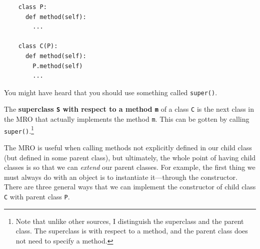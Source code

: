   \begin{lstlisting}
    class P: 
      def method(self): 
        ...

    class C(P): 
      def method(self): 
        P.method(self) 
        ...
  \end{lstlisting} 

  You might have heard that you should use something called \texttt{super()}. 

  \begin{definition}[Superclass]
    \label{def:superclass}
 
    The \textbf{superclass \texttt{S} with respect to a method \texttt{m}} of a class \texttt{C} is the next class in the MRO that actually implements the method \texttt{m}. This can be gotten by calling \texttt{super()}.\footnote{Note that unlike other sources, I distinguish the superclass and the parent class. The superclass is with respect to a method, and the parent class does not need to specify a method.}
  \end{definition} 

  The MRO is useful when calling methods not explicitly defined in our child class (but defined in some parent class), but ultimately, the whole point of having child classes is so that we can \textit{extend} our parent classes. For example, the first thing we must always do with an object is to instantiate it---through the constructor. There are three general ways that we can implement the constructor of child class \texttt{C} with parent class \texttt{P}. 

